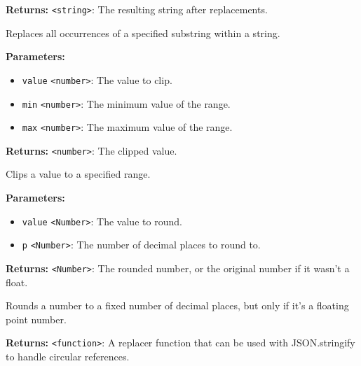 \documentclass[12pt,a4paper]{article}
\begin{document}
\noindent \textbf{Returns:} \texttt{<string>}: The resulting string after replacements.

\noindent Replaces all occurrences of a specified substring within a string.

\vspace{5mm}
\noindent {}


\noindent \textbf{Parameters:}
\begin{itemize}
  \item \texttt{value} \texttt{<number>}: The value to clip.
  \item \texttt{min} \texttt{<number>}: The minimum value of the range.
  \item \texttt{max} \texttt{<number>}: The maximum value of the range.
\end{itemize}

\noindent \textbf{Returns:} \texttt{<number>}: The clipped value.

\noindent Clips a value to a specified range.

\vspace{5mm}
\noindent {}


\noindent \textbf{Parameters:}
\begin{itemize}
  \item \texttt{value} \texttt{<Number>}: The value to round.
  \item \texttt{p} \texttt{<Number>}: The number of decimal places to round to.
\end{itemize}

\noindent \textbf{Returns:} \texttt{<Number>}: The rounded number, or the original number if it wasn't a float.

\noindent Rounds a number to a fixed number of decimal places, but only if it's a floating point number.

\vspace{5mm}
\noindent {}


\noindent \textbf{Returns:} \texttt{<function>}: A replacer function that can be used with JSON.stringify to handle circular references.
\end{document}
